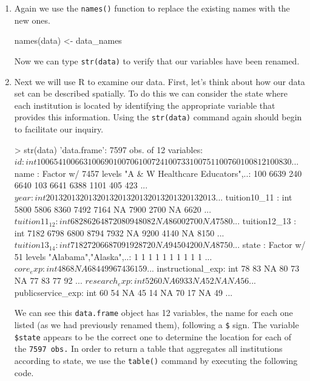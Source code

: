 \documentclass{article}
\newenvironment{Schunk}{}{}
\newcommand{\code}[1]{\texttt{#1}}
\newcommand{\proglang}[1]{\textsf{#1}}
\begin{document}
{\begin{enumerate}[leftmargin=15mm]
\item Again we use the \code{names()} function to replace the existing names with the new ones.

\begin{Schunk}
\begin{Sinput}

names(data) <- data_names

\end{Sinput}
\end{Schunk}

Now we can type \code{str(data)} to verify that our variables have been renamed.

\item Next we will use \proglang{R} to examine our data.  First, let's think about how our data set can be described spatially.  To do this we can consider the state where each institution is located by identifying the appropriate variable that provides this information.  Using the \code{str(data)} command again should begin to facilitate our inquiry.

\begin{Schunk}
\begin{Sinput}

> str(data)
'data.frame':	7597 obs. of  12 variables:
 $ id               : int  100654 100663 100690 100706 100724 100733 100751 100760 100812 100830 ...
 $ name             : Factor w/ 7457 levels "A & W Healthcare Educators",..: 100 6639 240 6640 103 6641 6388 1101 405 423 ...
 $ year             : int  2013 2013 2013 2013 2013 2013 2013 2013 2013 2013 ...
 $ tuition10_11     : int  5800 5806 8360 7492 7164 NA 7900 2700 NA 6620 ...
 $ tuition11_12     : int  6828 6264 8720 8094 8082 NA 8600 2700 NA 7580 ...
 $ tuition12_13     : int  7182 6798 6800 8794 7932 NA 9200 4140 NA 8150 ...
 $ tuition13_14     : int  7182 7206 6870 9192 8720 NA 9450 4200 NA 8750 ...
 $ state            : Factor w/ 51 levels "Alabama","Alaska",..: 1 1 1 1 1 1 1 1 1 1 ...
 $ core_exp         : int  48 68 NA 68 44 99 67 43 61 59 ...
 $ instructional_exp: int  78 83 NA 80 73 NA 77 83 77 92 ...
 $ research_exp     : int  52 60 NA 69 33 NA 52 NA NA 56 ...
 $ publicservice_exp: int  60 54 NA 45 14 NA 70 17 NA 49 ...
 
\end{Sinput}
\end{Schunk}

We can see this \code{data.frame} object has 12 variables, the name for each one listed (as we had previously renamed them), following a \code{\$} sign.  The variable \code{\$state} appears to be the correct one to determine the location for each of the \code{7597 obs.}  In order to return a table that aggregates all institutions according to state, we use the \code{table()} command by executing the following code.


\end{enumerate}}
\end{document}
